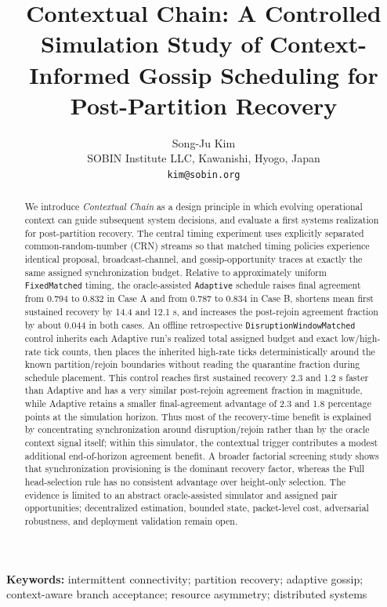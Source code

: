 \documentclass[11pt]{article}
\title{Contextual Chain: A Controlled Simulation Study of Context-Informed Gossip Scheduling for Post-Partition Recovery}
\author{Song-Ju Kim\\SOBIN Institute LLC, Kawanishi, Hyogo, Japan\\\texttt{kim@sobin.org}}
\date{}
\begin{document}
\maketitle

\begin{abstract}
We introduce \emph{Contextual Chain} as a design principle in which evolving operational context can guide subsequent system decisions, and evaluate a first systems realization for post-partition recovery. The central timing experiment uses explicitly separated common-random-number (CRN) streams so that matched timing policies experience identical proposal, broadcast-channel, and gossip-opportunity traces at exactly the same assigned synchronization budget. Relative to approximately uniform \texttt{FixedMatched} timing, the oracle-assisted \texttt{Adaptive} schedule raises final agreement from 0.794 to 0.832 in Case A and from 0.787 to 0.834 in Case B, shortens mean first sustained recovery by 14.4 and 12.1 s, and increases the post-rejoin agreement fraction by about 0.044 in both cases. An offline retrospective \texttt{DisruptionWindowMatched} control inherits each Adaptive run's realized total assigned budget and exact low/high-rate tick counts, then places the inherited high-rate ticks deterministically around the known partition/rejoin boundaries without reading the quarantine fraction during schedule placement. This control reaches first sustained recovery 2.3 and 1.2 s faster than Adaptive and has a very similar post-rejoin agreement fraction in magnitude, while Adaptive retains a smaller final-agreement advantage of 2.3 and 1.8 percentage points at the simulation horizon. Thus most of the recovery-time benefit is explained by concentrating synchronization around disruption/rejoin rather than by the oracle context signal itself; within this simulator, the contextual trigger contributes a modest additional end-of-horizon agreement benefit. A broader factorial screening study shows that synchronization provisioning is the dominant recovery factor, whereas the Full head-selection rule has no consistent advantage over height-only selection. The evidence is limited to an abstract oracle-assisted simulator and assigned pair opportunities; decentralized estimation, bounded state, packet-level cost, adversarial robustness, and deployment validation remain open.
\end{abstract}

\noindent\textbf{Keywords:} intermittent connectivity; partition recovery; adaptive gossip; context-aware branch acceptance; resource asymmetry; distributed systems
\end{document}
